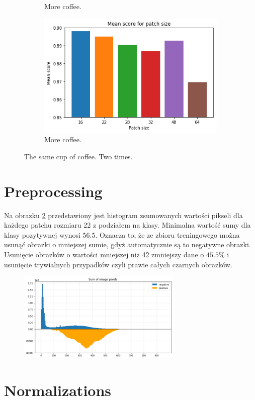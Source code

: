 \begin{figure}[h!]
\begin{subfigure}[b]{0.45\linewidth}
    \caption{More coffee.}
  \end{subfigure}
  \begin{subfigure}[b]{0.45\linewidth}
    \includegraphics[width=\linewidth]{images/patch_score}
    \caption{More coffee.}
  \end{subfigure}
  \caption{The same cup of coffee. Two times.}
  \label{fig:supervised_patches}
\end{figure}

\section{Preprocessing}

Na obrazku \ref{fig:pixel_sums} przedstawiony jest histogram zsumowanych wartości pikseli dla każdego patchu rozmiaru 22 z podziałem na klasy. Minimalna wartość sumy dla klasy pozytywnej wynosi $56.5$. Oznacza to, że ze zbioru treningowego można usunąć obrazki o mniejszej sumie, gdyż automatycznie są to negatywne obrazki. Usunięcie obrazków o wartości mniejszej niż 42 zmniejszy dane o $45.5\%$ i usunięcie trywialnych przypadków czyli prawie całych czarnych obrazków.

\begin{figure}[h!]
    \centering
    \includegraphics[width=0.7\textwidth]{images/pixel_sums}
    \caption{}
    \label{fig:pixel_sums}
\end{figure}

\section{Normalizations}


